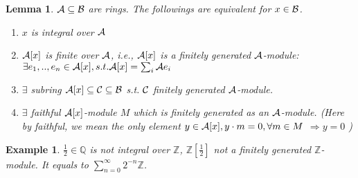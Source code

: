 \documentclass[11pt]{article}
\newtheorem{lemma}[thm]{Lemma}
\newtheorem{ex}[thm]{Example}
\newcommand{\intg}{\mathbb Z}
\newcommand{\ratl}{\mathbb Q}
\newcommand{\cala}{{\cal A}}
\newcommand{\calb}{{\cal B}}
\newcommand{\calc}{{\cal C}}
\newcommand{\Lrta}{\Longrightarrow}
\begin{document}
\begin{lemma}\label{lem:characterization_integral}
$\cala\subseteq \calb$ are rings. The followings are equivalent for $x\in\calb$.
\begin{enumerate}[label=\roman*).]
\item $x$ is integral over $\cala$
\item $\cala[x]$ is finite over $\cala$, i.e., $\cala[x]$ is a finitely generated $\cala$-module: $\exists e_1,..,e_n\in\cala[x],s.t. \cala[x]=\sum_i\cala e_i$
\item $\exists $ subring $\cala[x]\subseteq \calc\subseteq \calb$ s.t. $\calc$ finitely generated $\cala$-module.
\item $\exists$ faithful $\cala[x]$-module $M$ which is finitely generated as an $\cala$-module.
(Here by faithful, we mean the only element $y\in\cala[x], y\cdot m=0,\forall m\in M$ $\Lrta y=0$ )
\end{enumerate}
\end{lemma}
\begin{ex}
$\frac{1}{2}\in\ratl$ is not integral over $\intg$, $\intg[\frac{1}{2}]$ not a finitely generated $\intg$-module. It equals to  $\sum_{n=0}^\infty 2^{-n}\intg$.
\end{ex}
\end{document}

